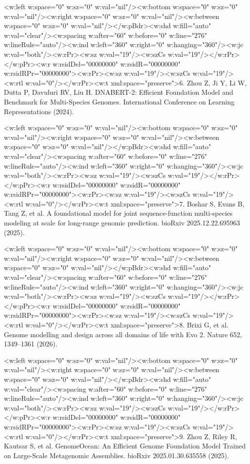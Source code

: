 \documentclass[11pt]{article}
\begin{document}
<w:left w:space="0" w:sz="0" w:val="nil"/><w:bottom w:space="0" w:sz="0" w:val="nil"/><w:right w:space="0" w:sz="0" w:val="nil"/><w:between w:space="0" w:sz="0" w:val="nil"/></w:pBdr><w:shd w:fill="auto" w:val="clear"/><w:spacing w:after="60" w:before="0" w:line="276" w:lineRule="auto"/><w:ind w:left="360" w:right="0" w:hanging="360"/><w:jc w:val="both"/><w:rPr><w:sz w:val="19"/><w:szCs w:val="19"/></w:rPr></w:pPr><w:r w:rsidDel="00000000" w:rsidR="00000000" w:rsidRPr="00000000"><w:rPr><w:sz w:val="19"/><w:szCs w:val="19"/><w:rtl w:val="0"/></w:rPr><w:t xml:space="preserve">6. Zhou Z, Ji Y, Li W, Dutta P, Davuluri RV, Liu H. DNABERT-2: Efficient Foundation Model and Benchmark for Multi-Species Genomes. International Conference on Learning Representations (2024).

<w:left w:space="0" w:sz="0" w:val="nil"/><w:bottom w:space="0" w:sz="0" w:val="nil"/><w:right w:space="0" w:sz="0" w:val="nil"/><w:between w:space="0" w:sz="0" w:val="nil"/></w:pBdr><w:shd w:fill="auto" w:val="clear"/><w:spacing w:after="60" w:before="0" w:line="276" w:lineRule="auto"/><w:ind w:left="360" w:right="0" w:hanging="360"/><w:jc w:val="both"/><w:rPr><w:sz w:val="19"/><w:szCs w:val="19"/></w:rPr></w:pPr><w:r w:rsidDel="00000000" w:rsidR="00000000" w:rsidRPr="00000000"><w:rPr><w:sz w:val="19"/><w:szCs w:val="19"/><w:rtl w:val="0"/></w:rPr><w:t xml:space="preserve">7. Boshar S, Evans B, Tang Z, et al. A foundational model for joint sequence-function multi-species modeling at scale for long-range genomic prediction. bioRxiv 2025.12.22.695963 (2025).

<w:left w:space="0" w:sz="0" w:val="nil"/><w:bottom w:space="0" w:sz="0" w:val="nil"/><w:right w:space="0" w:sz="0" w:val="nil"/><w:between w:space="0" w:sz="0" w:val="nil"/></w:pBdr><w:shd w:fill="auto" w:val="clear"/><w:spacing w:after="60" w:before="0" w:line="276" w:lineRule="auto"/><w:ind w:left="360" w:right="0" w:hanging="360"/><w:jc w:val="both"/><w:rPr><w:sz w:val="19"/><w:szCs w:val="19"/></w:rPr></w:pPr><w:r w:rsidDel="00000000" w:rsidR="00000000" w:rsidRPr="00000000"><w:rPr><w:sz w:val="19"/><w:szCs w:val="19"/><w:rtl w:val="0"/></w:rPr><w:t xml:space="preserve">8. Brixi G, et al. Genome modelling and design across all domains of life with Evo 2. Nature 652, 1349–1361 (2026).

<w:left w:space="0" w:sz="0" w:val="nil"/><w:bottom w:space="0" w:sz="0" w:val="nil"/><w:right w:space="0" w:sz="0" w:val="nil"/><w:between w:space="0" w:sz="0" w:val="nil"/></w:pBdr><w:shd w:fill="auto" w:val="clear"/><w:spacing w:after="60" w:before="0" w:line="276" w:lineRule="auto"/><w:ind w:left="360" w:right="0" w:hanging="360"/><w:jc w:val="both"/><w:rPr><w:sz w:val="19"/><w:szCs w:val="19"/></w:rPr></w:pPr><w:r w:rsidDel="00000000" w:rsidR="00000000" w:rsidRPr="00000000"><w:rPr><w:sz w:val="19"/><w:szCs w:val="19"/><w:rtl w:val="0"/></w:rPr><w:t xml:space="preserve">9. Zhou Z, Riley R, Kautsar S, et al. GenomeOcean: An Efficient Genome Foundation Model Trained on Large-Scale Metagenomic Assemblies. bioRxiv 2025.01.30.635558 (2025).
\end{document}
